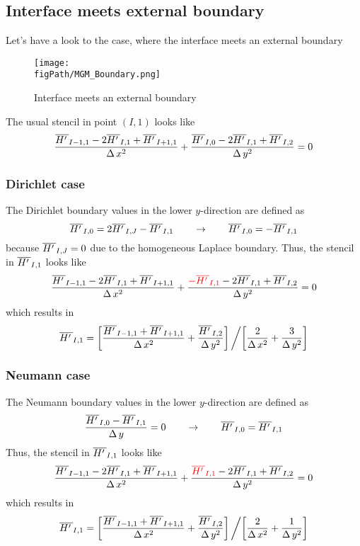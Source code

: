 \subsection{Interface meets external boundary}

Let's have a look to the case, where the interface meets an external boundary

\begin{figure}[H]
\begin{center}
\texttt{[image: \\figPath/MGM\_Boundary.png]}
\end{center}
\caption{Interface meets an external boundary}
\label{FIG_InterfaceBdry}
\end{figure}


\noindent The usual stencil in point $(I,1)$ looks like 
\[ \frac{\overline{{H'\,}}_{I-1,1} - 2 \overline{{H'\,}}_{I,1} + \overline{{H'\,}}_{I+1,1}}{\Delta \, x^2}  +  \frac{\overline{{H'\,}}_{I,0} - 2 \overline{{H'\,}}_{I,1} + \overline{{H'\,}}_{I,2}}{\Delta \, y^2} = 0\]


\subsubsection{Dirichlet case}

\noindent  The Dirichlet boundary values in the lower $y$-direction are defined as
\[\overline{{H'\,}}_{I,0}  = 2 \overline{{H'\,}}_{I,J} - \overline{{H'\,}}_{I,1} \qquad \rightarrow \qquad  \overline{{H'\,}}_{I,0}  =  - \overline{{H'\,}}_{I,1} \]
\noindent because $\overline{{H'\,}}_{I,J}=0$ due to the homogeneous Laplace boundary.
\noindent Thus, the stencil in $\overline{{H'\,}}_{I,1}$ looks like
\[\frac{\overline{{H'\,}}_{I-1,1} - 2 \overline{{H'\,}}_{I,1} + \overline{{H'\,}}_{I+1,1}}{\Delta \, x^2}  +  \frac{ {\color{red}{-\overline{{H'\,}}_{I,1}}} - 2 \overline{{H'\,}}_{I,1} + \overline{{H'\,}}_{I,2}}{\Delta \, y^2} = 0 \]
\noindent which results in  
\[\overline{{H'\,}}_{I,1} =  \left[\frac{\overline{{H'\,}}_{I-1,1} + \overline{{H'\,}}_{I+1,1}}{\Delta \, x^2}  +  \frac{\overline{{H'\,}}_{I,2}}{\Delta \, y^2}\right] \biggl/ \left[\frac{2 }{\Delta \, x^2}  +  \frac{3}{\Delta \, y^2}\right]\]

\newpage
\subsubsection{Neumann case}

\noindent  The Neumann boundary values in the lower $y$-direction are defined as
\[\frac{\overline{{H'\,}}_{I,0} - \overline{{H'\,}}_{I,1}}{\Delta \, y}  = 0   \qquad \rightarrow \qquad   \overline{{H'\,}}_{I,0} = \overline{{H'\,}}_{I,1} \]
\noindent Thus, the stencil in $\overline{{H'\,}}_{I,1}$ looks like
\[\frac{\overline{{H'\,}}_{I-1,1} - 2 \overline{{H'\,}}_{I,1} + \overline{{H'\,}}_{I+1,1}}{\Delta \, x^2}  +  \frac{ {\color{red}{\overline{{H'\,}}_{I,1}}} - 2 \overline{{H'\,}}_{I,1} + \overline{{H'\,}}_{I,2}}{\Delta \, y^2} = 0 \]
\noindent which results in  
\[\overline{{H'\,}}_{I,1} =  \left[\frac{\overline{{H'\,}}_{I-1,1} + \overline{{H'\,}}_{I+1,1}}{\Delta \, x^2}  +  \frac{\overline{{H'\,}}_{I,2}}{\Delta \, y^2}\right] \biggl/ \left[\frac{2 }{\Delta \, x^2}  +  \frac{1}{\Delta \, y^2}\right]\]


